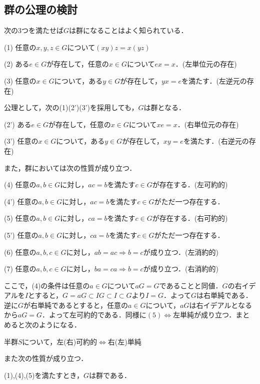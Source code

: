\documentclass{jsarticle}
\begin{document}
\subsection{群の公理の検討}
次の3つを満たせば$G$は群になることはよく知られている．
\begin{description}
\item{(1)} 任意の$x,y,z\in G$について$(xy)z=x(yz)$
\item{(2)} ある$e\in G$が存在して，任意の$x\in G$について$ex=x$．(左単位元の存在)
\item{(3)} 任意の$x\in G$について，ある$y\in G$が存在して，$yx=e$を満たす．(左逆元の存在)
\end{description}
公理として，次の(1)(2')(3')を採用しても，$G$は群となる．
\begin{description}
\item{(2')} ある$e\in G$が存在して，任意の$x\in G$について$xe=x$．(右単位元の存在)
\item{(3')} 任意の$x\in G$について，ある$y\in G$が存在して，$xy=e$を満たす．(右逆元の存在)
\end{description}
また，群においては次の性質が成り立つ．
\begin{description}
\item{(4)} 任意の$a,b\in G$に対し，$ac=b$を満たす$c\in G$が存在する．(左可約的)
\item{(4')} 任意の$a,b\in G$に対し，$ac=b$を満たす$c\in G$がただ一つ存在する．
\item{(5)} 任意の$a,b\in G$に対し，$ca=b$を満たす$c\in G$が存在する．(右可約的)
\item{(5')} 任意の$a,b\in G$に対し，$ca=b$を満たす$c\in G$がただ一つ存在する．
\item{(6)} 任意の$a,b,c\in G$に対し，$ab=ac\Rightarrow b=c$が成り立つ．(左消約的)
\item{(7)} 任意の$a,b,c\in G$に対し，$ba=ca\Rightarrow b=c$が成り立つ．(右消約的)
\end{description}
ここで，(4)の条件は任意の$a\in G$について$aG=G$であることと同値．$G$の右イデアルを$I$とすると，$G=aG\subset IG\subset I\subset G$より$I=G$．よって$G$は右単純である．逆に$G$が右単純であるとすると，任意の$a\in G$について，$aG$は右イデアルとなるから$aG=G$．よって左可約的である．同様に$(5)\Longleftrightarrow$左単純が成り立つ．まとめると次のようになる．
\begin{prop}
半群$S$について，左(右)可約的$\Longleftrightarrow$右(左)単純
\end{prop}
また次の性質が成り立つ．
\begin{thm}
(1),(4),(5)を満たすとき，$G$は群である．
\end{thm}
\end{document}
